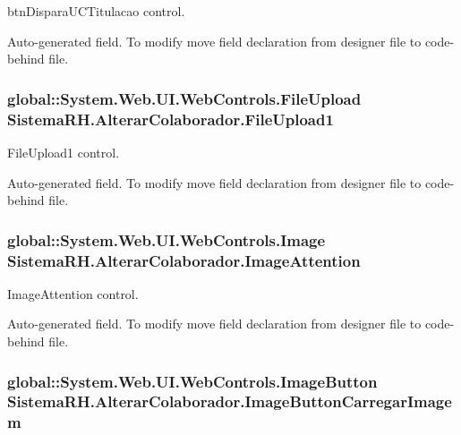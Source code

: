 btnDisparaUCTitulacao control. 

Auto-\/generated field. To modify move field declaration from designer file to code-\/behind file. \hypertarget{class_sistema_r_h_1_1_alterar_colaborador_af832da780e06ca16234e93b76f0d6df3}{
\subsubsection[{FileUpload1}]{\setlength{\rightskip}{0pt plus 5cm}global::System.Web.UI.WebControls.FileUpload {\bf SistemaRH.AlterarColaborador.FileUpload1}}}
\label{class_sistema_r_h_1_1_alterar_colaborador_af832da780e06ca16234e93b76f0d6df3}


FileUpload1 control. 

Auto-\/generated field. To modify move field declaration from designer file to code-\/behind file. \hypertarget{class_sistema_r_h_1_1_alterar_colaborador_a229a3e9094be062d93e632c0722bbaf9}{
\subsubsection[{ImageAttention}]{\setlength{\rightskip}{0pt plus 5cm}global::System.Web.UI.WebControls.Image {\bf SistemaRH.AlterarColaborador.ImageAttention}}}
\label{class_sistema_r_h_1_1_alterar_colaborador_a229a3e9094be062d93e632c0722bbaf9}


ImageAttention control. 

Auto-\/generated field. To modify move field declaration from designer file to code-\/behind file. \hypertarget{class_sistema_r_h_1_1_alterar_colaborador_a82100735e224772af2ede53ad193b274}{
\subsubsection[{ImageButtonCarregarImagem}]{\setlength{\rightskip}{0pt plus 5cm}global::System.Web.UI.WebControls.ImageButton {\bf SistemaRH.AlterarColaborador.ImageButtonCarregarImagem}}}
\label{class_sistema_r_h_1_1_alterar_colaborador_a82100735e224772af2ede53ad193b274}


